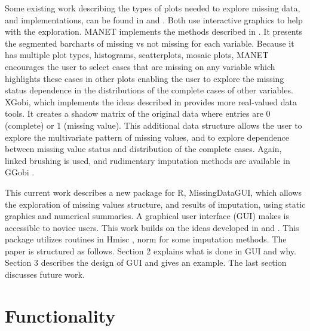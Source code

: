 \documentclass[english]{article}
\newcommand{\pkg}[1]{{\fontseries{b}\selectfont #1}}
\begin{document}
Some existing work describing the types of plots needed to explore missing data, and implementations, can be found in \citet{unwin1996interactive} and \citet{swayne1998missing}. Both use interactive graphics to help with the exploration.  MANET implements the methods described in \citet{unwin1996interactive}. It presents the segmented barcharts of missing vs not missing for each variable. Because it has multiple plot types, histograms, scatterplots, mosaic plots, MANET encourages the user to select cases that are missing on any variable which highlights these cases in other plots enabling the user to explore the missing status dependence in the distributions of the complete cases of other variables.  XGobi, which implements the ideas described in \citet{swayne1998missing} provides more real-valued data tools. It creates a shadow matrix of the original data where entries are 0 (complete) or 1 (missing value). This additional data structure allows the user to explore the multivariate pattern of missing values, and to explore dependence between missing value status and distribution of the complete cases. Again, linked brushing is used, and rudimentary imputation methods are available in GGobi \citep{STLBC03}.

This current work describes a new package for R, \pkg{MissingDataGUI}, which allows the exploration of missing values structure, and results of imputation, using static graphics and numerical summaries. A graphical user interface (GUI) makes is accessible to novice users. This work builds on the ideas developed in \citet{unwin1996interactive} and \citet{swayne1998missing}. This package utilizes routines in \pkg{Hmisc} \citep{hmisc}, \pkg{norm} \citep{norm} for some imputation methods. The paper is structured as follows. Section 2 explains what is done in GUI and why. Section 3 describes the design of GUI and gives an example. The last section discusses future work.

\section{Functionality}
\end{document}
